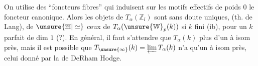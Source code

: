 \margin{$\unsure{\ast}$}
On utilise des ``foncteurs fibres'' qui induisent sur
les motifs effectifs de poids $0$ le foncteur
canonique. Alors les objets de $T_\alpha(\mathbb Z_l)$ sont
sans doute uniques, (th. de Lang), de $\unsure{\overline{\mathrm m}|\simeq}$
ceux de $T_\alpha(\unsure{\mathbb W}_p(k))$ si $k$ fini (ib),  pour un
$k$ parfait de dim  $1$ (?). En général, il
faut s'attendre que $T_\alpha(k)$  plus d'un
 à isom près, mais il est possible
que $T_{\unsure{\infty}}(k)=\varprojlim T_\alpha(k)$ n'a qu'un  à
isom près, celui donné par la  de DeRham
Hodge.


